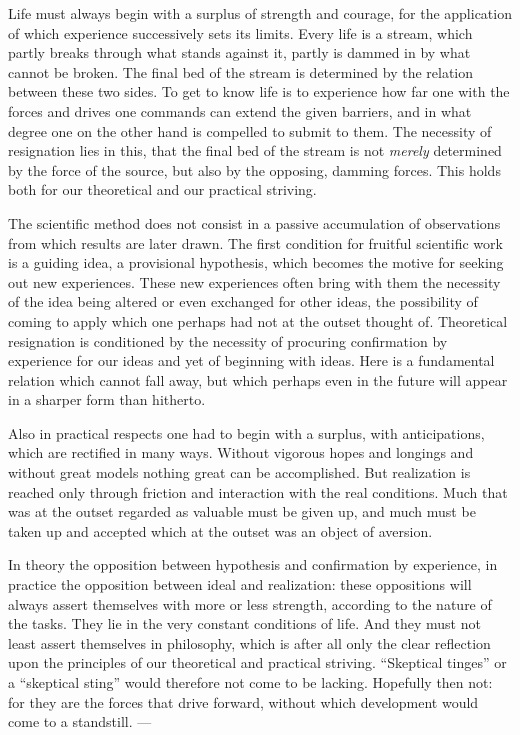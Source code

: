 \documentclass[12pt,a4paper,openany]{book}
\newcommand{\opage}[1]{\marginnote{\footnotesize\textit{[#1]}}}
\begin{document}
Life must always begin with a surplus of strength and
courage, for the application of which experience successively sets its
limits. Every life is a stream, which partly breaks through
what stands against it, partly is dammed in by what cannot be
broken. The final bed of the stream is determined by the relation
between these two sides. To get to know life is to experience
how far one with the forces and drives one commands
can extend the given barriers, and in what degree one
on the other hand is compelled to submit to them. The necessity of
resignation lies in this, that the final bed of the stream is not \emph{merely}
determined by the force of the source, but also by the
opposing, damming forces. This holds both for
our theoretical and our practical striving.

The scientific method does not consist in a passive
accumulation of observations from which results are later
drawn. The first condition for fruitful scientific
work is a guiding idea, a provisional hypothesis, which becomes
the motive for seeking out new experiences. These new experiences
often bring with them the necessity of the idea being altered or even
exchanged for other ideas, the possibility of coming to apply which one
perhaps had not at the outset thought of.
Theoretical resignation is conditioned by the necessity of
procuring confirmation by experience for our ideas and yet of
\opage{28}beginning with ideas. Here is a fundamental relation which cannot
fall away, but which perhaps even in the future will
appear in a sharper form than hitherto.

Also in practical respects one had to begin with
a surplus, with anticipations, which are rectified in many ways.
Without vigorous hopes and longings and without
great models nothing great can be accomplished. But
realization is reached only through friction and interaction with
the real conditions. Much that was at the outset regarded as
valuable must be given up, and much must be taken up and accepted which
at the outset was an object of aversion.

In theory the opposition between hypothesis and
confirmation by experience, in practice the opposition between ideal and
realization: these oppositions will always assert themselves
with more or less strength, according to the nature of the tasks.
They lie in the very constant conditions of life. And they must not
least assert themselves in philosophy, which is after all only the
clear reflection upon the principles of our theoretical and
practical striving. ``Skeptical tinges'' or a ``skeptical sting''
would therefore not come to be lacking. Hopefully then
not: for they are the forces that drive forward, without which
development would come to a standstill. ---
\end{document}
